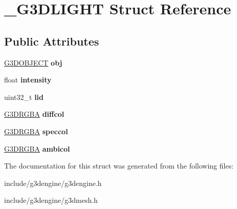 \hypertarget{struct__G3DLIGHT}{}\section{\+\_\+\+G3\+D\+L\+I\+G\+HT Struct Reference}
\label{struct__G3DLIGHT}
\subsection*{Public Attributes}
\begin{DoxyCompactItemize}
\item 
\mbox{\label{struct__G3DLIGHT_a3ae550e2d6bf0207b8226fc11d6339ad}} 
\hyperlink{struct__G3DOBJECT}{G3\+D\+O\+B\+J\+E\+CT} {\bfseries obj}
\item 
\mbox{\label{struct__G3DLIGHT_a983d3fd20543f181c7107def63ee1083}} 
float {\bfseries intensity}
\item 
\mbox{\label{struct__G3DLIGHT_a3c48073472ebeaf458e22f79a9a69d74}} 
uint32\+\_\+t {\bfseries lid}
\item 
\mbox{\label{struct__G3DLIGHT_aaf8fc7406d5bc75fcb145b9f76d81378}} 
\hyperlink{structG3DRGBA}{G3\+D\+R\+G\+BA} {\bfseries diffcol}
\item 
\mbox{\label{struct__G3DLIGHT_a63432a527d6716b4dd3e73fe29b4b05f}} 
\hyperlink{structG3DRGBA}{G3\+D\+R\+G\+BA} {\bfseries speccol}
\item 
\mbox{\label{struct__G3DLIGHT_a40303133d27dee82b52b1a58c2c1f2ab}} 
\hyperlink{structG3DRGBA}{G3\+D\+R\+G\+BA} {\bfseries ambicol}
\end{DoxyCompactItemize}


The documentation for this struct was generated from the following files\+:\begin{DoxyCompactItemize}
\item 
include/g3dengine/g3dengine.\+h\item 
include/g3dengine/g3dmesh.\+h\end{DoxyCompactItemize}

